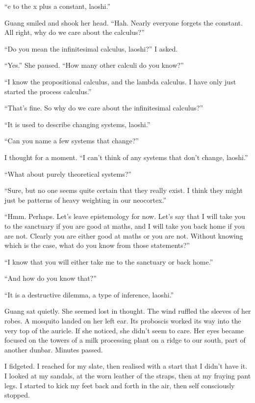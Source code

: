 ``e to the x plus a constant, laoshi.''

Guang smiled and shook her head. ``Hah. Nearly everyone forgets the constant. All right, why do we care about the calculus?''

``Do you mean the infinitesimal calculus, laoshi?'' I asked.

``Yes.'' She paused. ``How many other calculi do you know?''

``I know the propositional calculus, and the lambda calculus. I have only just started the process calculus.''

``That's fine. So why do we care about the infinitesimal calculus?''

``It is used to describe changing systems, laoshi.''

``Can you name a few systems that change?''

I thought for a moment. ``I can't think of any systems that don't change, laoshi.''

``What about purely theoretical systems?''

``Sure, but no one seems quite certain that they really exist. I think they might just be patterns of heavy weighting in our neocortex.''

``Hmm. Perhaps. Let's leave epistemology for now. Let's say that I will take you to the sanctuary if you are good at maths, and I will take you back home if you are not. Clearly you are either good at maths or you are not. Without knowing which is the case, what do you know from those statements?''

``I know that you will either take me to the sanctuary or back home.''

``And how do you know that?''

``It is a destructive dilemma, a type of inference, laoshi.''

Guang sat quietly. She seemed lost in thought. The wind ruffled the sleeves of her robes. A mosquito landed on her left ear. Its proboscis worked its way into the very top of the auricle. If she noticed, she didn't seem to care. Her eyes became focused on the towers of a milk processing plant on a ridge to our south, part of another dunbar. Minutes passed.

I fidgeted. I reached for my slate, then realised with a start that I didn't have it. I looked at my sandals, at the worn leather of the straps, then at my fraying pant legs. I started to kick my feet back and forth in the air, then self consciously stopped.

